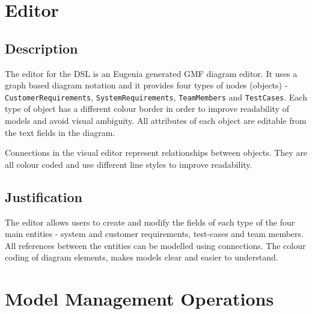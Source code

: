 \documentclass[11pt,a4paper]{article}
\begin{document}
	\section{Editor} \label{sec:editor}
	
	\subsection{Description}
	The editor for the DSL is an Eugenia \cite{eugenia} generated GMF \cite{gmf} diagram editor. It uses a graph based diagram notation and it provides four types of nodes (objects) - \texttt{CustomerRequirements}, \texttt{SystemRequirements}, \texttt{TeamMembers} and \texttt{TestCases}. Each type of object has a different colour border in order to improve readability of models and avoid visual ambiguity. All attributes of each object are editable from the text fields in the diagram.
	
	Connections in the visual editor represent relationships between objects. They are all colour coded and use different line styles to improve readability.
	
	\subsection{Justification}
	The editor allows users to create and modify the fields of each type of the four main entities - system and customer requirements, test-cases and team members. All references between the entities can be modelled using connections. The colour coding of diagram elements, makes models clear and easier to understand.


	\section{Model Management Operations}
	
\end{document}
